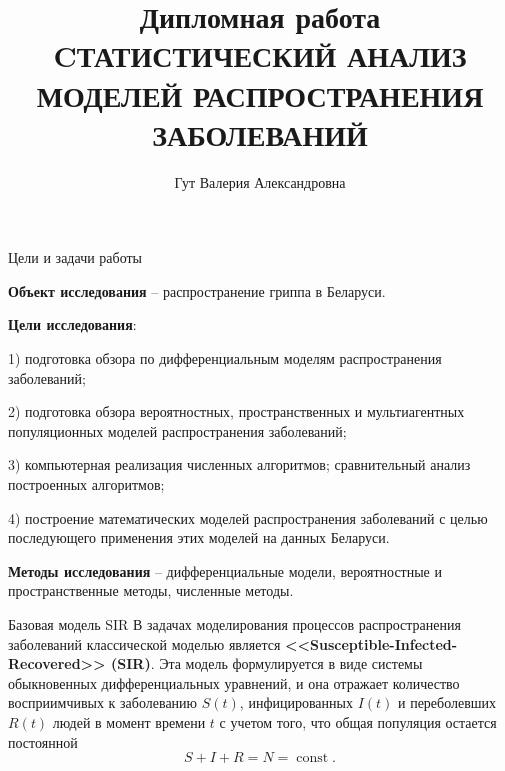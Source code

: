 \documentclass[notheorems]{beamer}
\title[Модели распространения заболеваний]{Дипломная работа \\ \Large CТАТИСТИЧЕСКИЙ АНАЛИЗ МОДЕЛЕЙ РАСПРОСТРАНЕНИЯ ЗАБОЛЕВАНИЙ}
\author[В. А. Гут]{Гут Валерия Александровна}
\institute[]{Научный руководитель: С.В. Лобач}
\date[]{}%
\begin{document}
\begin{frame}[plain]
  \titlepage
\end{frame}


\begin{frame}{Цели и задачи работы}
	
\textbf{Объект исследования} -- распространение гриппа в Беларуси.

\textbf{Цели исследования}:

1) подготовка обзора по дифференциальным моделям распространения заболеваний;

2) подготовка обзора вероятностных, пространственных и мультиагентных популяционных моделей распространения заболеваний;

3) компьютерная реализация численных алгоритмов; сравнительный анализ построенных алгоритмов;

4) построение математических моделей распространения заболеваний с целью последующего применения этих моделей на данных Беларуси.

\textbf{Методы исследования} -- дифференциальные модели, вероятностные и пространственные методы, численные методы.
	


\end{frame}

\begin{frame}
	{Базовая модель SIR}
	В задачах моделирования процессов распространения заболеваний классической моделью является \textbf{<<Susceptible-Infected-Recovered>> (SIR)}. Эта модель формулируется в виде системы обыкновенных дифференциальных уравнений, и она отражает количество восприимчивых к заболеванию $S(t)$, инфицированных $I(t)$ и переболевших $R(t)$ людей в момент времени $t$ с учетом того, что общая популяция остается постоянной
	\begin{equation}
		S+I+R = N = \operatorname{const}.
	\end{equation} 
	
\end{frame}
\end{document}
